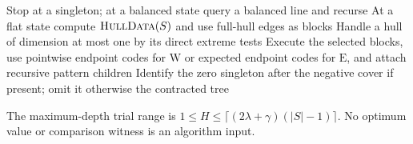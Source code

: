 \begin{algorithm}[H]
\caption{Graded adjacent-block recursion: the quasipolynomial baselines}
\label{alg:qp-baselines}
Stop at a singleton; at a balanced state query a balanced line and recurse\;
At a flat state compute $\textnormal{\textsc{HullData}}(S)$ and use full-hull edges as blocks\;
Handle a hull of dimension at most one by its direct extreme tests\;
Execute the selected blocks, use pointwise endpoint codes for $\mathrm W$
or expected endpoint codes for $\mathrm E$, and attach recursive pattern children\;
Identify the zero singleton after the negative cover if present; omit it otherwise\;
\KwRet the contracted tree\;
\end{algorithm}

The maximum-depth trial range is
$1\le H\le\lceil(2\lambda+\gamma)(|S|-1)\rceil$.
No optimum value or comparison witness is an algorithm input.
